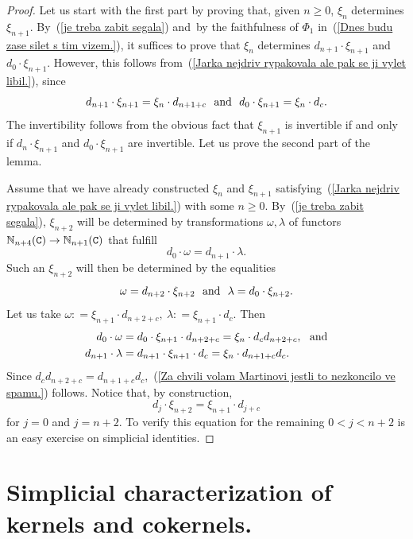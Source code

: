 \documentclass[12pt,leqno]{amsart}
\theoremstyle{definition}
\newcommand{\C}{{\tt C}}
\newcommand{\NN}{\mathbb{N}}
\newcommand{\4}{\texttt{4}}
\begin{document}
\begin{proof}
Let us start with the first part by proving that, given $n \geq 0$,
$\xi_n$ determines $\xi_{n+1}$. By~(\ref{je treba zabit
  segala}) and\ by the faithfulness of $\Phi_1$ in~(\ref{Dnes budu
  zase silet s tim vizem.}), it suffices to prove that $\xi_n$
determines $d_{n+1} \cdot\xi_{n+1}$ and $d_0\cdot \xi_{n+1}$. However, this
follows from~(\ref{Jarka nejdriv rypakovala ale pak se ji vylet
  libil.}), since
\[
d_{n+1}\cdot \xi_{n+1} = \xi_n\cdot d_{n+1+c} \ \hbox { and } \
d_0 \cdot\xi_{n+1} = \xi_n\cdot d_{c}.
\]
The invertibility follows from the obvious fact that $\xi_{n+1}$ is
invertible if and only if  $d_n \cdot\xi_{n+1}$ and $d_0\cdot
\xi_{n+1}$ are invertible. 
Let us prove the second part of the lemma.

Assume that we have already constructed $\xi_n$ and $\xi_{n+1}$ satisfying~(\ref{Jarka nejdriv rypakovala ale pak se ji vylet libil.})
with  some $n\geq 0$.
By~(\ref{je treba zabit segala}), $\xi_{n+2}$ 
will be determined by transformations $\omega,\lambda$ of functors 
$\NN_{n+4}(\C) \to   \NN_{n+1}(\C)$ that fulfill
\begin{equation}
\label{Za chvili volam Martinovi jestli to nezkoncilo ve spamu.}
d_0 \cdot \omega =
d_{n+1} \cdot \lambda.
\end{equation}
Such an $\xi_{n+2}$ will then be determined
by the equalities 
\[
\omega = d_{n+2} \cdot \xi_{n+2} \ \hbox {   and } \ 
\lambda = d_0 \cdot \xi_{n+2}.
\] 
Let us take
$\omega: = \xi_{n+1} \cdot d_{n+2+c}, \ 
\lambda: = \xi_{n+1} \cdot d_{c}$. 
Then 
\begin{align*}
d_0 \cdot\omega &= d_0 \cdot \xi_{n+1} \cdot d_{n+2+c} =
\xi_n  \cdot d_c  d_{n+2+c},\ \hbox { and}
\\
d_{n+1} \cdot \lambda &= d_{n+1} \cdot \xi_{n+1} \cdot d_c 
=
\xi_n \cdot d_{n+1+c} d_c. 
\end{align*}
Since $d_c  d_{n+2+c} =  d_{n+1+c} d_c$,~(\ref{Za chvili volam
  Martinovi jestli to nezkoncilo ve spamu.}) follows. Notice that, by
construction, 
\[
d_{j} \cdot \xi_{n+2} = \xi_{n+1} \cdot d_{j+c}
\]
for $j=0$ and $j=n+2$. To verify this equation for the remaining $0 <
j < n+2$ is an easy exercise on simplicial identities.
\end{proof}


\section{Simplicial characterization of kernels and cokernels.}
\label{Jeste musime na chalupu strihat vrbicky.}
\end{document}
